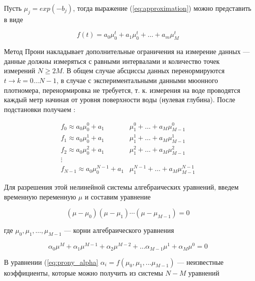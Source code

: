 Пусть $\mu_j = exp(-b_j)$, тогда выражение (\ref{eq:approximation}) можно представить в виде 

\begin{equation}
  \label{eq:prony_nonlinear}
  \mathit{ f(t)  = a_0 \mu_0^t + a_1 \mu_0^t + \ldots + a_m \mu_M^t }
\end{equation}


Метод Прони накладывает дополнительные ограничения на измерение данных --- данные должны измеряться с равными 
интервалами и количество точек измерений $N \geq 2M$. В общем случае абсциссы данных перенормируются $t \to k = 0 \ldots N-1$, 
в случае с экспериментальными данными мюонного плотномера, перенормировка не требуется, т. к. измерения на воде
проводятся каждый метр начиная от уровня поверхности воды (нулевая глубина). После подстановки получаем :

\begin{equation}
  \begin{split}
  f_0  \approx a_0 \mu_0^0 + a_1 & \mu_1^0 + \ldots + a_M \mu_{M-1}^0 \\
  f_1  \approx a_0 \mu_0^1 + a_1 & \mu_1^1 + \ldots + a_M \mu_{M-1}^1  \\
  f_2  \approx a_0 \mu_0^2 + a_1 & \mu_1^2 + \ldots + a_M \mu_{M-1}^2  \\
  \vdots & \\
  f_{N-1} \approx a_0 \mu_{0}^{N-1} + a_1 & \mu_{1}^{N-1} + \ldots + a_M \mu_{M-1}^{N-1}
  \end{split}
  \label{eq:prony_system}
\end{equation}

Для разрешения этой нелинейной системы алгебраических уравнений, введем временную переменную $\mu$ и составим уравнение 

\begin{equation}
\label{eq:prony_algebra}
	\left( \mu - \mu_0 \right) 
	\left( \mu - \mu_1 \right) \cdots 
	\left( \mu - \mu_{M-1} \right) = 0  
\end{equation}

где $\mu_0,\mu_1, \ldots , \mu_{M-1}$ --- корни алгебраического
уравнения 

\begin{equation}
	\label{eq:prony_alpha}
	\alpha_0 \mu ^ M + 
	\alpha_1 \mu ^ {M-1} + 
	\alpha_2 \mu ^ {M-2} + \ldots
	\alpha_{M-1} \mu ^ 1 + 
	\alpha_{M} \mu ^ 0 = 0
\end{equation}

В уравнении (\ref{eq:prony_alpha}  $\alpha_i = f (\mu_0, \mu_1, ... \mu_{M-1} )$  --- неизвестные коэффициенты, которые можно получить из системы $ N - M $ уравнений 

